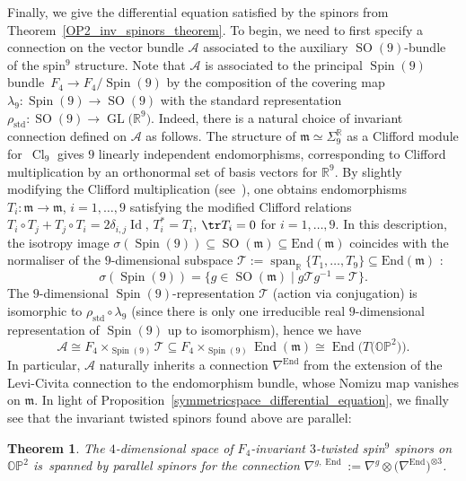 \documentclass[pdftex]{sigma}
\numberwithin{equation}{section}
\newtheorem{Theorem}{Theorem}[section]
\newcommand{\R}{\mathbb{R}} %
\DeclareMathOperator{\Id}{Id}
\DeclareMathOperator{\Span}{span}
\DeclareMathOperator{\std}{std}
\DeclareMathOperator{\GL}{GL}
\DeclareMathOperator{\SO}{SO}
\DeclareMathOperator{\Spin}{Spin}
\DeclareMathOperator{\Cl}{Cl}
\DeclareMathOperator{\End}{End}
\begin{document}
		Finally, we give the differential equation satisfied by the spinors from Theorem~\ref{OP2_inv_spinors_theorem}. To begin, we need to first specify a connection on the vector bundle $\mathcal{A}$ associated to the auxiliary $\SO(9)$-bundle of the spin$^9$ structure. Note that $\mathcal{A}$ is associated to the principal $\Spin(9)$ bundle~${F_4\to F_4/\Spin(9)}$ by the composition of the covering map $\lambda_9\colon \Spin(9)\to \SO(9)$ with the standard representation $\rho_{\std}\colon \SO(9) \to \GL\bigl(\R^9\bigr)$. Indeed, there is a natural choice of invariant connection defined on $\mathcal{A}$ as follows. The structure of $\mathfrak{m}\simeq \Sigma_9^{\R} $ as a Clifford module for~$\Cl_9$ gives $9$ linearly independent endomorphisms, corresponding to Clifford multiplication by an orthonormal set of basis vectors for $\R^9$. By slightly modifying the Clifford multiplication (see~\cite[Section~2]{Fri01_weak_spin9}), one obtains endomorphisms $T_i\colon \mathfrak{m}\to\mathfrak{m}$, $i=1,\dots, 9$ satisfying the modified Clifford relations
		$
		T_i \circ T_j + T_j\circ T_i = 2\delta_{i,j}\Id$, $ T_i^* = T_i$, $ \tr T_i =0$
		for $i=1,\dots,9$. In this description, the isotropy image $\sigma (\Spin(9)) \subseteq \SO(\mathfrak{m}) \subseteq \text{End}(\mathfrak{m}) $ coincides with the normaliser of the $9$-dimensional subspace $\mathcal{T}:= \Span_{\R}\{T_1,\dots, T_9\} \subseteq \text{End}(\mathfrak{m}) $ \cite[p.~132]{Fri01_weak_spin9}:
		\[%
			\sigma(\Spin(9)) = \bigl\{ g\in \SO(\mathfrak{m})\mid g\mathcal{T}g^{-1} = \mathcal{T} \bigr\}.
		\]
		The $9$-dimensional $\Spin(9)$-representation $\mathcal{T}$ (action via conjugation) is isomorphic to $\rho_{\std}\circ \lambda_9$ (since there is only one irreducible real $9$-dimensional representation of $\Spin(9)$ up to isomorphism), hence we have
		\[
		\mathcal{A} \cong F_4 \times_{\Spin(9)} \mathcal{T} \subseteq F_4 \times_{\Spin(9)} \End(\mathfrak{m}) \cong \End\bigl( T\bigl(\mathbb{OP}^2\bigr)\bigr).
		\]
		In particular, $\mathcal{A}$ naturally inherits a connection $\nabla^{\End}$ from the extension of the Levi-Civita connection to the endomorphism bundle, whose Nomizu map vanishes on $\mathfrak{m}$. In light of Proposition~\ref{symmetricspace_differential_equation}, we finally see that the invariant twisted spinors found above are parallel:
		
		\begin{Theorem}
			\!The $4$-dimensional space of $F_4$-invariant $3$-twisted spin$^9$ spinors on $\mathbb{OP}^2$ is~span\-ned by parallel spinors for the connection $\nabla^{g,\End}:= \nabla^g \otimes \bigl(\nabla^{\End}\bigr)^{\otimes 3}$.
		\end{Theorem}
		
\end{document}
